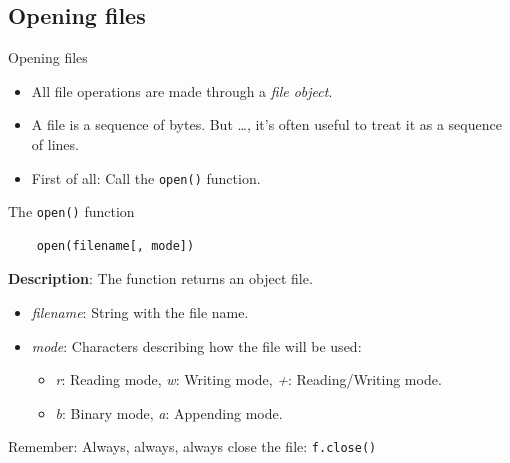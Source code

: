 \documentclass[10pt,compress]{beamer} %
\begin{document}
\subsection{Opening files}
\begin{frame}[fragile]{Opening files}{}
	\begin{itemize}
	\item \small{All file operations are made through a \textit{file object}.}
	\item \small{A file is a sequence of bytes. But \ldots, it's often useful to treat it as a sequence of lines.} %
	\item \small{First of all: Call the \texttt{open()} function.}
	\end{itemize}

	\begin{block}{The \texttt{open()} function}
	\begin{verbatim}
	open(filename[, mode])	
	\end{verbatim}
	\vspace{-0.2cm}
	\textbf{Description}: The function returns an object file.\\
	\vspace{-0.2cm}
	\begin{itemize}
	\item \textit{filename}: String with the file name.
	\item \textit{mode}: Characters describing how the file will be used:
		\begin{itemize}
		\item \textit{r}: Reading mode, \textit{w}: Writing mode,  \textit{+}:  Reading/Writing mode. %
		\item \textit{b}: Binary mode, \textit{a}: Appending mode.
		\end{itemize}
	\end{itemize}
	\end{block}
	\small{\alert{Remember}: Always, always, always close the file: \texttt{f.close()}}
\end{frame}
\end{document}
